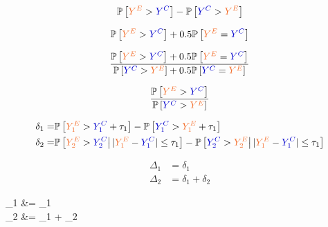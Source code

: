 \documentclass[12pt]{article}
\theoremstyle{definition}
\newcommand{\darkgreen}{green!70!black}
\newcommand{\darkblue}{blue!80!black}
\begin{document}
\begin{align*}
	\mathbb{P}\left[\textcolor{Orange}{Y^E}>\textcolor{\darkblue}{Y^C}\right]-\mathbb{P}\left[\textcolor{\darkblue}{Y^C}>\textcolor{Orange}{Y^E}\right]
\end{align*}

\begin{align*}
	\mathbb{P}\left[\textcolor{Orange}{Y^E}>\textcolor{\darkblue}{Y^C}\right]+0.5\mathbb{P}\left[\textcolor{Orange}{Y^E}=\textcolor{\darkblue}{Y^C}\right]
\end{align*}

\begin{align*}
	\frac{\mathbb{P}\left[\textcolor{Orange}{Y^E}>\textcolor{\darkblue}{Y^C}\right]+0.5\mathbb{P}\left[\textcolor{Orange}{Y^E}=\textcolor{\darkblue}{Y^C}\right]}{
	\mathbb{P}\left[\textcolor{\darkblue}{Y^C}>\textcolor{Orange}{Y^E}\right]+0.5\mathbb{P}\left[\textcolor{\darkblue}{Y^C}=\textcolor{Orange}{Y^E}\right]}
\end{align*}

\begin{align*}
	\frac{\mathbb{P}\left[\textcolor{Orange}{Y^E}>\textcolor{\darkblue}{Y^C}\right]}{\mathbb{P}\left[\textcolor{\darkblue}{Y^C}>\textcolor{Orange}{Y^E}\right]}
\end{align*}


\begin{align*}
	\delta_1 = &\mathbb{P}\left[\textcolor{Orange}{Y_1^E}>\textcolor{\darkblue}{Y_1^C}+\tau_1\right]-\mathbb{P}\left[\textcolor{\darkblue}{Y_1^C}>\textcolor{Orange}{Y_1^E}+\tau_1\right] \\
	\delta_2 = &\mathbb{P}\left[\textcolor{Orange}{Y_2^E}>\textcolor{\darkblue}{Y_2^C}\big| \, |\textcolor{Orange}{Y_1^E}-\textcolor{\darkblue}{Y_1^C}| \leq \tau_1\right]-\mathbb{P}\left[\textcolor{\darkblue}{Y_2^C}>\textcolor{Orange}{Y_2^E}\big| \, |\textcolor{Orange}{Y_1^E}-\textcolor{\darkblue}{Y_1^C}| \leq \tau_1\right] 
\end{align*}



\begin{align*}
	\Delta_1 &= \delta_1 \\
		\Delta_2 &= \delta_1 + \delta_2
\end{align*}

\begin{minipage}{3.5cm}
\begin{tcolorbox}[ams align*, colback=white, colframe=\darkgreen]
	\Delta_1 &= \delta_1 \\
	\Delta_2 &= \delta_1 + \delta_2
\end{tcolorbox}
\end{minipage}
\end{document}
